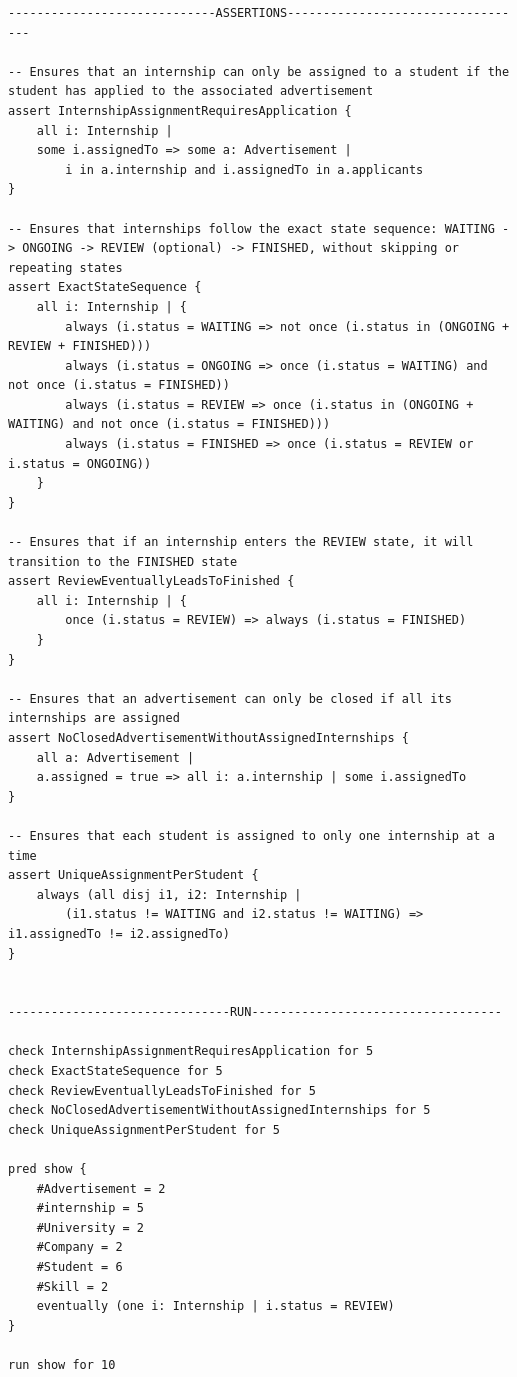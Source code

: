 \begin{lstlisting}
-----------------------------ASSERTIONS----------------------------------

-- Ensures that an internship can only be assigned to a student if the student has applied to the associated advertisement
assert InternshipAssignmentRequiresApplication {
    all i: Internship | 
    some i.assignedTo => some a: Advertisement | 
        i in a.internship and i.assignedTo in a.applicants
}

-- Ensures that internships follow the exact state sequence: WAITING -> ONGOING -> REVIEW (optional) -> FINISHED, without skipping or repeating states
assert ExactStateSequence {
    all i: Internship | {
        always (i.status = WAITING => not once (i.status in (ONGOING + REVIEW + FINISHED)))
        always (i.status = ONGOING => once (i.status = WAITING) and not once (i.status = FINISHED))
        always (i.status = REVIEW => once (i.status in (ONGOING + WAITING) and not once (i.status = FINISHED)))
        always (i.status = FINISHED => once (i.status = REVIEW or i.status = ONGOING))
    }
}

-- Ensures that if an internship enters the REVIEW state, it will transition to the FINISHED state
assert ReviewEventuallyLeadsToFinished {
    all i: Internship | {
        once (i.status = REVIEW) => always (i.status = FINISHED)
    }
}

-- Ensures that an advertisement can only be closed if all its internships are assigned
assert NoClosedAdvertisementWithoutAssignedInternships {
    all a: Advertisement | 
    a.assigned = true => all i: a.internship | some i.assignedTo
}

-- Ensures that each student is assigned to only one internship at a time
assert UniqueAssignmentPerStudent {
    always (all disj i1, i2: Internship | 
        (i1.status != WAITING and i2.status != WAITING) => i1.assignedTo != i2.assignedTo)
}


-------------------------------RUN-----------------------------------

check InternshipAssignmentRequiresApplication for 5
check ExactStateSequence for 5
check ReviewEventuallyLeadsToFinished for 5
check NoClosedAdvertisementWithoutAssignedInternships for 5
check UniqueAssignmentPerStudent for 5

pred show {
    #Advertisement = 2
    #internship = 5
    #University = 2
    #Company = 2
    #Student = 6
    #Skill = 2
    eventually (one i: Internship | i.status = REVIEW)
}

run show for 10


\end{lstlisting}



